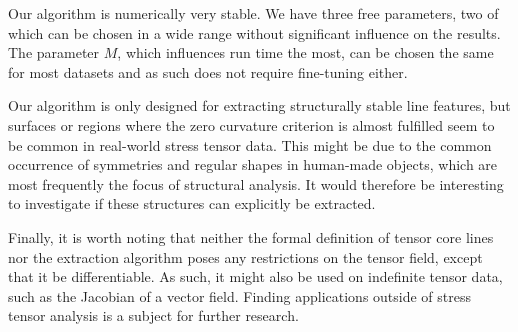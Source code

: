 %
Our algorithm is numerically very stable.
%
We have three free parameters, two of which can be chosen in a wide range
without significant influence on the results.
%
The parameter $M$, which influences run time the most, can be chosen the same
for most datasets and as such does not require fine-tuning either.
%

%
Our algorithm is only designed for extracting structurally stable line
features, but surfaces or regions where the zero curvature criterion is
almost fulfilled seem to be common in real-world stress tensor data.
%
This might be due to the common occurrence of symmetries and regular shapes in
human-made objects, which are most frequently the focus of structural analysis.
%
It would therefore be interesting to investigate if these structures can
explicitly be extracted.
%

%
Finally, it is worth noting that neither the formal definition of tensor core
lines nor the extraction algorithm poses any restrictions on the tensor field,
except that it be differentiable.
%
As such, it might also be used on indefinite tensor data, such as the Jacobian
of a vector field.
%
Finding applications outside of stress tensor analysis is a subject for further
research.
%